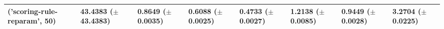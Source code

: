 \begin{tabular}{llllllll}
('scoring-rule-reparam', 50) & \makecell{43.4383 \\ ($\pm$ 43.4383)} & \makecell{0.8649 \\ ($\pm$ 0.0035)} & \makecell{0.6088 \\ ($\pm$ 0.0025)} & \makecell{0.4733 \\ ($\pm$ 0.0027)} & \makecell{1.2138 \\ ($\pm$ 0.0085)} & \makecell{0.9449 \\ ($\pm$ 0.0028)} & \makecell{3.2704 \\ ($\pm$ 0.0225)} \\
\bottomrule
\end{tabular}
